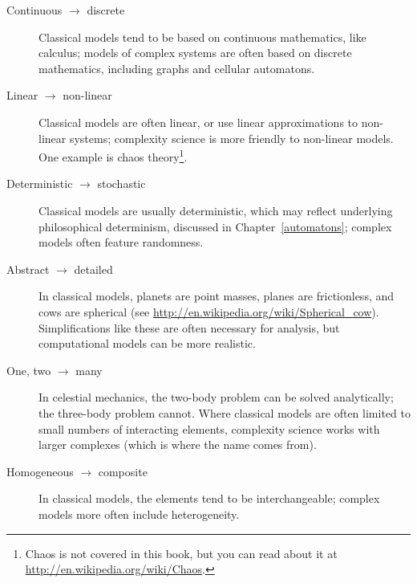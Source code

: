 \documentclass[12pt]{book}
\theoremstyle{exercise}
\begin{document}
\begin{description}

\item[Continuous $\rightarrow$ discrete] Classical models tend to be
  based on continuous mathematics, like calculus; models of complex
  systems are often based on discrete mathematics, including graphs and
  cellular automatons.


\item[Linear $\rightarrow$ non-linear] Classical models are often
  linear, or use linear approximations to non-linear systems;
  complexity science is more friendly to non-linear models.  One example
  is chaos theory\footnote{Chaos is not covered in this book, but you can
  read about it at \url{http://en.wikipedia.org/wiki/Chaos}.}.


\item[Deterministic $\rightarrow$ stochastic] Classical models are
  usually deterministic, which may reflect underlying philosophical
  determinism, discussed in Chapter~\ref{automatons}; complex models
  often feature randomness.


\item[Abstract $\rightarrow$ detailed] In classical models, planets are
  point masses, planes are frictionless, and cows are
  spherical (see \url{http://en.wikipedia.org/wiki/Spherical_cow}).
  Simplifications like these are often necessary for analysis,
  but computational models can be more realistic.


\item[One, two $\rightarrow$ many] In celestial mechanics, the
  two-body problem can be solved analytically; the three-body problem
  cannot.  Where classical models are often limited to
  small numbers of interacting elements, complexity science works with
  larger complexes (which is where the name comes from).


\item[Homogeneous $\rightarrow$ composite] In classical models, the
  elements tend to be interchangeable; complex models more often
  include heterogeneity.


\end{description}
\end{document}
